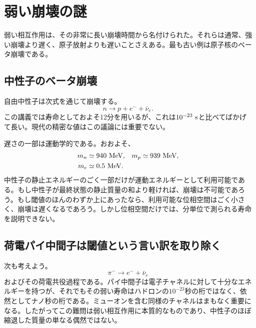 \begin{classroomqa}
\end{classroomqa}

\section{弱い崩壊の謎}

弱い相互作用は、その非常に長い崩壊時間から名付けられた。それらは通常、強い崩壊より遅く、原子放射よりも遅いことさえある。最も古い例は原子核のベータ崩壊である。

\subsection{中性子のベータ崩壊}

自由中性子は次式を通じて崩壊する。
\begin{equation}
n\longrightarrow p+e^-+\bar\nu_e.
\label{eq:l5-neutron-decay-intro}
\end{equation}
この講義では寿命としておよそ12分を用いるが、これは\(10^{-23}\ {\rm s}\)と比べてばかげて長い。現代の精密な値はこの議論には重要でない。

遅さの一部は運動学的である。おおよそ、
\begin{equation}
\begin{aligned}
m_n&\simeq940\ {\rm MeV},
&
m_p&\simeq939\ {\rm MeV},
\\
m_e&\simeq0.5\ {\rm MeV}.
\end{aligned}
\end{equation}
中性子の静止エネルギーのごく一部だけが運動エネルギーとして利用可能である。もし中性子が最終状態の静止質量の和より軽ければ、崩壊は不可能であろう。もし閾値のほんのわずか上にあったなら、利用可能な位相空間はごく小さく、崩壊は遅くなるであろう。しかし位相空間だけでは、分単位で測られる寿命を説明できない。

\subsection{荷電パイ中間子は閾値という言い訳を取り除く}

次も考えよう。
\begin{equation}
\pi^-\longrightarrow e^-+\bar\nu_e
\end{equation}
およびその荷電共役過程である。パイ中間子は電子チャネルに対して十分なエネルギーを持つが、それでもその弱い寿命はハドロンの\(10^{-23}\)秒の桁ではなく、依然としてナノ秒の桁である。ミューオンを含む同様のチャネルはまもなく重要になる。したがってこの難問は弱い相互作用に本質的なものであり、中性子のほぼ縮退した質量の単なる偶然ではない。

